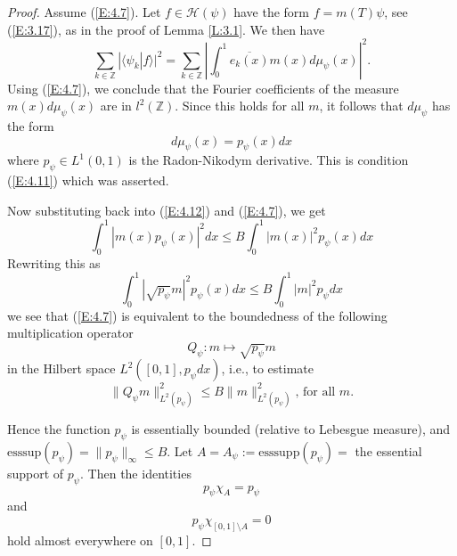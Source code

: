 \documentclass{birkmult}
\theoremstyle{definition}
\theoremstyle{remark}
\numberwithin{equation}{section}
\begin{document}
\begin{proof}
Assume (\ref{E:4.7}).  Let $f \in \mathcal{H}(\psi)$ have the form 
$f = m(T)\psi$, see (\ref{E:3.17}), as in the proof of Lemma \ref{L:3.1}.
We then have
\begin{equation}
\label{E:4.12}
  \sum_{k \in \mathbb{Z}} |\langle \psi_{k} | f \rangle|^{2}
  =\sum_{k \in \mathbb{Z}}\left\vert\int_{0}^{1}\overline{e_{k}(x)}m(x)d\mu_{\psi}(x)\right\vert^{2}.
\end{equation}
Using (\ref{E:4.7}), we conclude that the Fourier coefficients of the measure
$m(x)d\mu_{\psi}(x)$ are in $l^{2}(\mathbb{Z})$.  Since this holds for all
$m$, it follows that $d\mu_{\psi}$ has the form
\begin{equation}
\label{E:4.13}
  d\mu_{\psi}(x) = p_{\psi}(x)dx
\end{equation}
where $p_{\psi} \in L^{1}(0,1)$ is the Radon-Nikodym derivative.  This is
condition (\ref{E:4.11}) which was asserted.  

Now substituting back into (\ref{E:4.12}) and (\ref{E:4.7}), we get
\begin{equation}
\label{E:4.14}
  \int_{0}^{1}|m(x)p_{\psi}(x)|^{2}dx \leq B\int_{0}^{1}|m(x)|^{2}p_{\psi}(x)dx
\end{equation}
Rewriting this as 
\[
  \int_{0}^{1}|\sqrt{p_{\psi}}m|^{2}p_{\psi}(x)dx \leq B\int_{0}^{1}|m|^{2}p_{\psi}dx
\]
we see that (\ref{E:4.7}) is equivalent to the boundedness of the following 
multiplication operator
\begin{equation}
\label{E:4.15}
  Q_{\psi}: m \longmapsto \sqrt{p_{\psi}}m
\end{equation}
in the Hilbert space $L^{2}([0,1], p_{\psi}dx)$, i.e., to estimate
\begin{equation}
\label{E:4.16}
  \|Q_{\psi}m\|_{L^{2}(p_{\psi})}^{2} \leq  B\|m\|_{L^{2}(p_{\psi})}^{2} 
  \text{, for all } m.
\end{equation}

Hence the function $p_{\psi}$ is essentially bounded (relative to Lebesgue 
measure), and $\text{esssup}(p_{\psi}) = \|p_{\psi}\|_{\infty} \leq B$.
Let $A=A_{\psi}:=\text{esssupp}(p_{\psi})=$ the essential support of 
$p_{\psi}$.  Then the identities
\begin{equation}
\label{E:4.17}
  p_{\psi}\chi_{A} = p_{\psi}
\end{equation}
and
\begin{equation}
\label{E:4.18}
  p_{\psi}\chi_{[0,1]\setminus A} = 0
\end{equation}
hold almost everywhere on $[0,1]$.


\end{proof}
\end{document}
